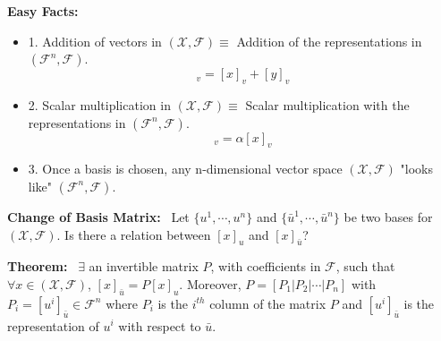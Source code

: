 \documentclass[letterpaper]{article}
\begin{document}
\noindent \textbf{Easy Facts:}~
    \begin{itemize}
        \item[] 1. Addition of vectors in $(\mathcal{X},\mathcal{F}) \equiv$ Addition of the representations in $(\mathcal{F}^n,\mathcal{F})$.
        \begin{equation*}
            [x+y]_v=[x]_v+[y]_v
        \end{equation*}
        \item[] 2. Scalar multiplication in $(\mathcal{X},\mathcal{F}) \equiv$ Scalar multiplication with the representations in $(\mathcal{F}^n,\mathcal{F})$.
        \begin{equation*}
            [\alpha x]_v=\alpha[x]_v
        \end{equation*}
        \item[] 3. Once a basis is chosen, any n-dimensional vector space $(\mathcal{X},\mathcal{F})$ "looks like" $(\mathcal{F}^n,\mathcal{F})$.
    \end{itemize}

\textbf{Change of Basis Matrix:}~ Let $\{u^1, \dotsb, u^n\}$ and $\{\bar{u}^1, \dotsb, \bar{u}^n\}$ be two bases for $(\mathcal{X},\mathcal{F})$. Is there a relation between $[x]_u$ and $[x]_{\bar{u}}$?

\noindent \textbf{Theorem:}~ $\exists$ an invertible matrix $P$, with coefficients in $\mathcal{F}$, such that $\forall x\in(\mathcal{X},\mathcal{F})$, $[x]_{\bar{u}}=P[x]_u$.
    \newline
    Moreover, $P=\left[P_1|P_2|\dotsb|P_n\right]$ with $P_i=[u^i]_{\bar{u}}\in\mathcal{F}^{n}$ where $P_i$ is the $i^{th}$ column of the matrix $P$ and $[u^i]_{\bar{u}}$ is the representation of $u^i$ with respect to $\bar{u}$.
\end{document}

